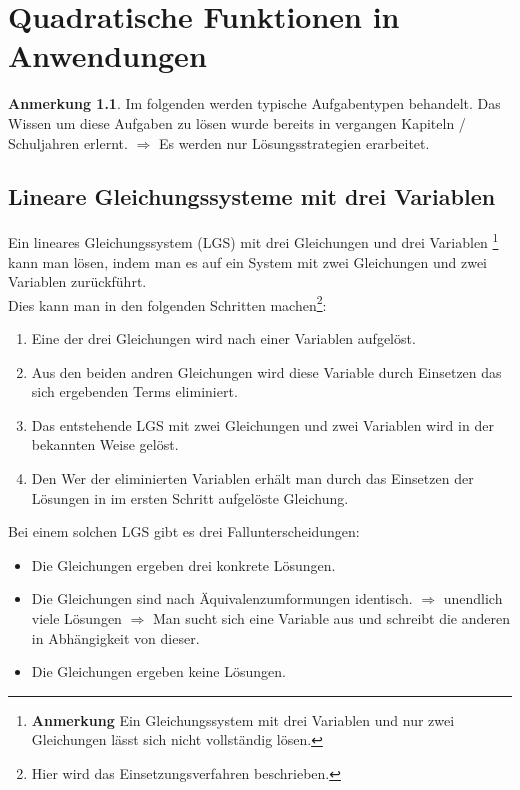 \documentclass{report}
\theoremstyle{definition}
\theoremstyle{definition}
\theoremstyle{an}
\newtheorem{anm}{Anmerkung}[section]
\theoremstyle{lem}
\theoremstyle{def}
\theoremstyle{def}
\begin{document}
	\chapter{Quadratische Funktionen in Anwendungen}
	\begin{anm}
		Im folgenden werden typische Aufgabentypen behandelt. Das Wissen um diese Aufgaben zu lösen wurde bereits in vergangen Kapiteln / Schuljahren erlernt. $\Rightarrow$ Es werden nur Lösungsstrategien erarbeitet.
	\end{anm}
	\section{Lineare Gleichungssysteme mit drei Variablen}
	\begin{merk}
		Ein lineares Gleichungssystem (LGS) mit drei Gleichungen und drei Variablen \footnote{\textbf{Anmerkung} \quad Ein Gleichungssystem mit drei Variablen und nur zwei Gleichungen lässt sich nicht vollständig lösen.} kann man lösen, indem man es auf ein System mit zwei Gleichungen und zwei Variablen zurückführt.\\
		Dies kann man in den folgenden Schritten machen\footnote{Hier wird das Einsetzungsverfahren beschrieben.}:
		\begin{enumerate}
			\item Eine der drei Gleichungen wird nach einer Variablen aufgelöst.
			\item Aus den beiden andren Gleichungen wird diese Variable durch Einsetzen das sich ergebenden Terms eliminiert.
			\item Das entstehende LGS mit zwei Gleichungen und zwei Variablen wird in der bekannten Weise gelöst.
			\item Den Wer der eliminierten Variablen erhält man durch das Einsetzen der Lösungen in im ersten Schritt aufgelöste Gleichung. 
		\end{enumerate}
	\end{merk}
	\begin{merk}
		Bei einem solchen LGS gibt es drei Fallunterscheidungen:
		\begin{itemize}
			\item Die Gleichungen ergeben drei konkrete Lösungen.
			\item Die Gleichungen sind nach Äquivalenzumformungen identisch. $\Rightarrow$ unendlich viele Lösungen $\Rightarrow$ Man sucht sich eine Variable aus und schreibt die anderen in Abhängigkeit von dieser. 
			\item Die Gleichungen ergeben keine Lösungen.
		\end{itemize}
	\end{merk}
\end{document}
